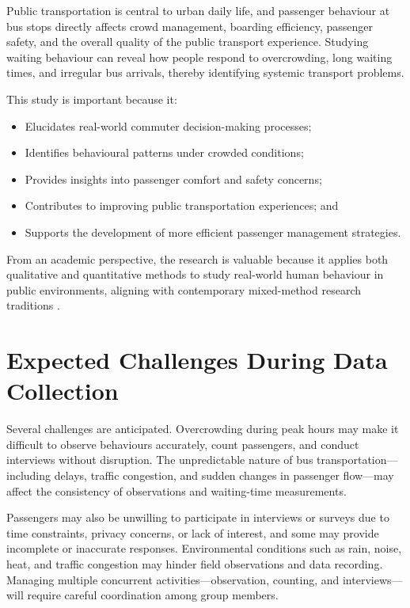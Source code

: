 \documentclass[12pt, a4paper]{report}
\begin{document}
Public transportation is central to urban daily life, and passenger behaviour at bus stops
directly affects crowd management, boarding efficiency, passenger safety, and the overall
quality of the public transport experience. Studying waiting behaviour can reveal how people
respond to overcrowding, long waiting times, and irregular bus arrivals, thereby identifying
systemic transport problems.

This study is important because it:

\begin{itemize}[noitemsep]
    \item Elucidates real-world commuter decision-making processes;
    \item Identifies behavioural patterns under crowded conditions;
    \item Provides insights into passenger comfort and safety concerns;
    \item Contributes to improving public transportation experiences; and
    \item Supports the development of more efficient passenger management strategies.
\end{itemize}

From an academic perspective, the research is valuable because it applies both qualitative
and quantitative methods to study real-world human behaviour in public environments,
aligning with contemporary mixed-method research traditions \citep{tashakkori2010}.

\section{Expected Challenges During Data Collection}

Several challenges are anticipated. Overcrowding during peak hours may make it difficult to
observe behaviours accurately, count passengers, and conduct interviews without
disruption. The unpredictable nature of bus transportation—including delays, traffic
congestion, and sudden changes in passenger flow—may affect the consistency of
observations and waiting-time measurements.

Passengers may also be unwilling to participate in interviews or surveys due to time
constraints, privacy concerns, or lack of interest, and some may provide incomplete or
inaccurate responses. Environmental conditions such as rain, noise, heat, and traffic
congestion may hinder field observations and data recording. Managing multiple concurrent
activities—observation, counting, and interviews—will require careful coordination among
group members.
\end{document}
